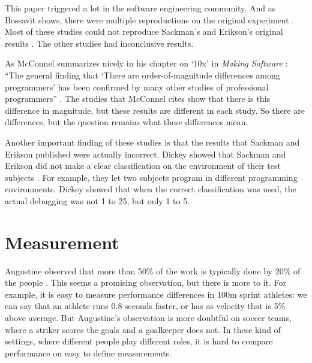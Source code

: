 This paper triggered a lot in the software engineering community.
And as Bossavit shows, there were multiple reproductions on the original experiment \autocite[38,41]{bossavit2013leprechauns}.
Most of these studies could not reproduce Sackman's and Erikson's original results \autocite[42-44]{bossavit2013leprechauns}.
The other studies had inconclusive results.

As McConnel summarizes nicely in his chapter on `10x' in \textit{Making Software} \autocite{MAKING_SOFTWARE}:
``The general finding that `There are order-of-magnitude differences among programmers' has been confirmed by many other studies of professional programmers'' \autocite[568]{MAKING_SOFTWARE}.
The studies that McConnel cites show that there is this difference in magnitude, but these results are different in each study.
So there are differences, but the question remains what these differences mean.

Another important finding of these studies is that the results that Sackman and Erikson published were actually incorrect.
Dickey showed that Sackman and Erikson did not make a clear classification on the environment of their test subjects \autocite[844]{dickey1981programmer}.
For example, they let two subjects program in different programming environments.
Dickey showed that when the correct classification was used, the actual debugging was not 1 to 25, but only 1 to 5.

\section*{Measurement}

Augustine observed that more than 50\% of the work is typically done by 20\% of the people \autocite{augustine}\autocite[268]{demarco1985programmer}.
This seems a promising observation, but there is more to it.
For example, it is easy to measure performance differences in 100m sprint athletes:
we can say that an athlete runs 0.8 seconds faster, or has as velocity that is 5\% above average.
But Augustine's observation is more doubtful on soccer teams, where a striker scores the goals and a goalkeeper does not.
In these kind of settings, where different people play different roles, it is hard to compare performance on easy to define measurements.

